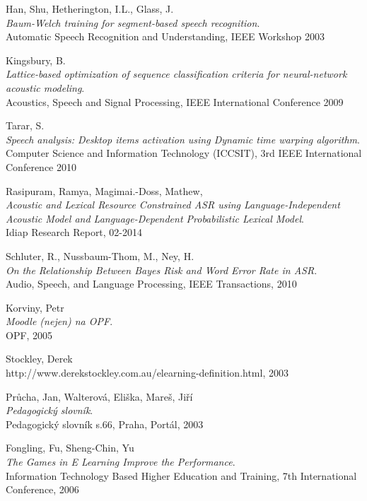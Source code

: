 \begin{thebibliography}{99}
  {\sc Han,} Shu, {\sc Hetherington,} I.L., {\sc Glass,} J.\\
  \emph{Baum-Welch training for segment-based speech recognition}.\\
  Automatic Speech Recognition and Understanding, IEEE Workshop 2003

  {\sc Kingsbury,} B.\\
  \emph{Lattice-based optimization of sequence classification criteria for neural-network acoustic modeling}.\\
  Acoustics, Speech and Signal Processing, IEEE International Conference 2009

  {\sc Tarar,} S.\\
  \emph{Speech analysis: Desktop items activation using Dynamic time warping algorithm}.\\
  Computer Science and Information Technology (ICCSIT), 3rd IEEE International Conference 2010 

  {\sc Rasipuram,} Ramya, {\sc Magimai.-Doss,} Mathew, \\
  \emph{Acoustic and Lexical Resource Constrained ASR using Language-Independent Acoustic Model and Language-Dependent Probabilistic Lexical Model}.\\
  Idiap Research Report, 02-2014

  {\sc Schluter,} R., {\sc Nussbaum-Thom,} M., {\sc Ney,} H.\\
  \emph{On the Relationship Between Bayes Risk and Word Error Rate in ASR}.\\
  Audio, Speech, and Language Processing, IEEE Transactions, 2010

  {\sc Korviny,} Petr\\
  \emph{Moodle (nejen) na OPF}.\\
  OPF, 2005

  {\sc Stockley,} Derek\\
  http://www.derekstockley.com.au/elearning-definition.html, 2003

  {\sc Průcha,} Jan, {\sc Walterová,} Eliška, {\sc Mareš,} Jiří\\
  \emph{Pedagogický slovník}.\\
  Pedagogický slovník s.66, Praha, Portál, 2003

  {\sc Fongling,} Fu, {\sc Sheng-Chin,} Yu\\
  \emph{The Games in E Learning Improve the Performance}.\\
  Information Technology Based Higher Education and Training, 7th International Conference, 2006


\end{thebibliography}
